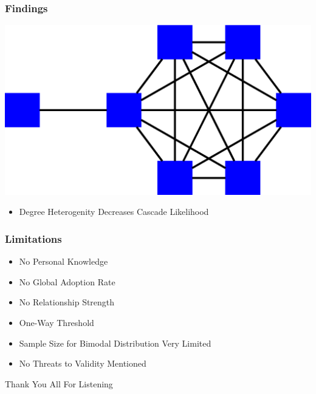 \documentclass[slidestop,usenames,dvipsnames]{beamer}
\newcommand{\fitem}{\pause\vfill\item}
\newcommand{\gitem}{\vfill\item}
\begin{document}
\begin{frame}
  \frametitle{Findings}
  \vfill
  \center\includegraphics[height=0.4\textheight]{img/degree}
  \begin{itemize}
    \gitem Degree Heterogenity Decreases Cascade Likelihood
  \end{itemize}
  \vfill
\end{frame}

\begin{frame}
    \frametitle{Limitations}
    \begin{itemize}
        \fitem No Personal Knowledge
        \fitem No Global Adoption Rate
        \fitem No Relationship Strength
        \fitem One-Way Threshold
        \fitem Sample Size for Bimodal Distribution Very Limited
        \fitem No Threats to Validity Mentioned
    \end{itemize}
    \vfill
\end{frame}




\begin{frame}
    \vfill
    \begin{center}
        {\Huge Thank You All For Listening}\
    \end{center}
\end{frame}
\end{document}
